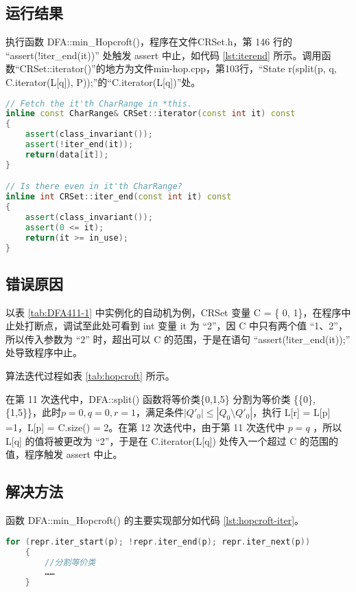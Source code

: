 \subsection{运行结果}\label{sec:hopcroft-error}
执行函数 DFA::min\_Hopcroft()，程序在文件CRSet.h，第 146 行的 “assert(!iter\_end(it))” 处触发 assert 中止，如代码 \ref{lst:iterend} 所示。调用函数“CRSet::iterator()”的地方为文件min-hop.cpp，第103行，“State r(split(p, q, C.iterator(L[q]), P));”的“C.iterator(L[q])”处。
\lstset{style=mystyle}
\begin{lstlisting}[language=C++,label={lst:iterend},caption={ CRSet.h },firstnumber=142]
// Fetch the it'th CharRange in *this.
inline const CharRange& CRSet::iterator(const int it) const
{
    assert(class_invariant());
    assert(!iter_end(it));
    return(data[it]);
}

// Is there even in it'th CharRange?
inline int CRSet::iter_end(const int it) const
{
    assert(class_invariant());
    assert(0 <= it);
    return(it >= in_use);
}
\end{lstlisting}

\subsection{错误原因}

以表 \ref{tab:DFA411-1} 中实例化的自动机为例，CRSet 变量 C = \{ 0, 1\}，在程序中止处打断点，调试至此处可看到 int 变量 it 为 “2”，因 C 中只有两个值 “1、2”，所以传入参数为 “2” 时，超出可以 C 的范围，于是在语句 “assert(!iter\_end(it));” 处导致程序中止。

算法迭代过程如表 \ref{tab:hopcroft} 所示。

在第 11 次迭代中，DFA::split() 函数将等价类\{0,1,5\} 分割为等价类 \{\{0\},\{1,5\}\}，此时$p=0,q=0,r=1$，满足条件$|Q'_0| \leq | Q_0 \setminus Q'_0 |$，执行 L[r] = L[p] =1，L[p] = C.size() = 2。在第 12 次迭代中，由于第 11 次迭代中 $p=q$ ，所以 L[q] 的值将被更改为 “2”，于是在 C.iterator(L[q]) 处传入一个超过 C 的范围的值，程序触发 assert 中止。

\subsection{解决方法}

函数 DFA::min\_Hopcroft() 的主要实现部分如代码 \ref{lst:hopcroft-iter}。
\lstset{style=mystyle}
\begin{lstlisting}[language=C++,label={lst:hopcroft-iter},caption={ min-hop.cpp },firstnumber=100]
    for (repr.iter_start(p); !repr.iter_end(p); repr.iter_next(p))
    {
        //分割等价类
        ……
    }
\end{lstlisting}

